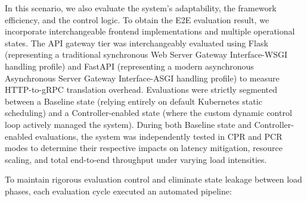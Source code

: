 \documentclass{ieeeaccess}
\begin{document}
	In this scenario, we also evaluate the system's adaptability, the framework efficiency, and the control logic. To obtain the E2E evaluation result, we incorporate interchangeable frontend implementations and multiple operational states. The API gateway tier was interchangeably evaluated using Flask (representing a traditional synchronous Web Server Gateway Interface-WSGI \cite{wsgi} handling profile) and FastAPI (representing a modern asynchronous Asynchronous Server Gateway Interface-ASGI \cite{asgi} handling profile) to measure HTTP-to-gRPC translation overhead. Evaluations were strictly segmented between a Baseline state (relying entirely on default Kubernetes static scheduling) and a Controller-enabled state (where the custom dynamic control loop actively managed the system). During both Baseline state and Controller-enabled evaluations, the system was independently tested in CPR and PCR modes to determine their respective impacts on latency mitigation, resource scaling, and total end-to-end throughput under varying load intensities.
	
	To maintain rigorous evaluation control and eliminate state leakage between load phases, each evaluation cycle executed an automated pipeline:
	
\end{document}
